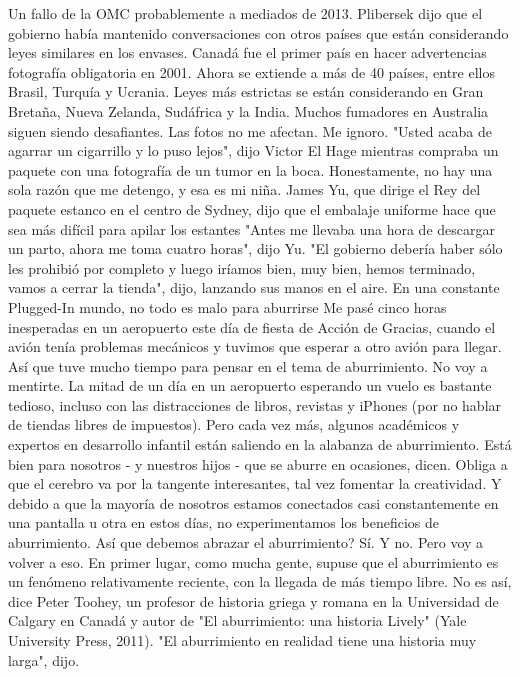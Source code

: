 Un fallo de la OMC probablemente a mediados de 2013.
Plibersek dijo que el gobierno había mantenido conversaciones con otros países que están considerando leyes similares en los envases.
Canadá fue el primer país en hacer advertencias fotografía obligatoria en 2001.
Ahora se extiende a más de 40 países, entre ellos Brasil, Turquía y Ucrania.
Leyes más estrictas se están considerando en Gran Bretaña, Nueva Zelanda, Sudáfrica y la India.
Muchos fumadores en Australia siguen siendo desafiantes.
Las fotos no me afectan.
Me ignoro.
"Usted acaba de agarrar un cigarrillo y lo puso lejos", dijo Victor El Hage mientras compraba un paquete con una fotografía de un tumor en la boca.
Honestamente, no hay una sola razón que me detengo, y esa es mi niña.
James Yu, que dirige el Rey del paquete estanco en el centro de Sydney, dijo que el embalaje uniforme hace que sea más difícil para apilar los estantes
"Antes me llevaba una hora de descargar un parto, ahora me toma cuatro horas", dijo Yu.
"El gobierno debería haber sólo les prohibió por completo y luego iríamos bien, muy bien, hemos terminado, vamos a cerrar la tienda", dijo, lanzando sus manos en el aire.
En una constante Plugged-In mundo, no todo es malo para aburrirse
Me pasé cinco horas inesperadas en un aeropuerto este día de fiesta de Acción de Gracias, cuando el avión tenía problemas mecánicos y tuvimos que esperar a otro avión para llegar.
Así que tuve mucho tiempo para pensar en el tema de aburrimiento.
No voy a mentirte.
La mitad de un día en un aeropuerto esperando un vuelo es bastante tedioso, incluso con las distracciones de libros, revistas y iPhones (por no hablar de tiendas libres de impuestos).
Pero cada vez más, algunos académicos y expertos en desarrollo infantil están saliendo en la alabanza de aburrimiento.
Está bien para nosotros - y nuestros hijos - que se aburre en ocasiones, dicen.
Obliga a que el cerebro va por la tangente interesantes, tal vez fomentar la creatividad.
Y debido a que la mayoría de nosotros estamos conectados casi constantemente en una pantalla u otra en estos días, no experimentamos los beneficios de aburrimiento.
Así que debemos abrazar el aburrimiento?
Sí.
Y no.
Pero voy a volver a eso.
En primer lugar, como mucha gente, supuse que el aburrimiento es un fenómeno relativamente reciente, con la llegada de más tiempo libre.
No es así, dice Peter Toohey, un profesor de historia griega y romana en la Universidad de Calgary en Canadá y autor de "El aburrimiento: una historia Lively" (Yale University Press, 2011).
"El aburrimiento en realidad tiene una historia muy larga", dijo.
